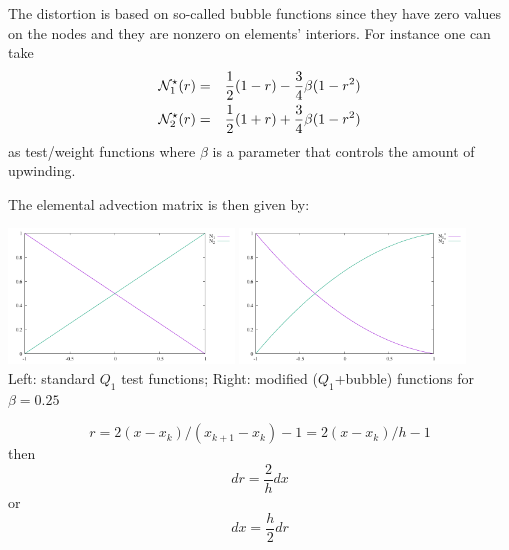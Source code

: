 The distortion is based on so-called bubble functions since they have zero
values on the nodes and they are nonzero on elements' interiors.
For instance one can take
\begin{eqnarray}
{{\mathcal{N}}}^\star_1(r)&=&\frac{1}{2}(1-r)-\frac{3}{4}\beta(1-r^2) \\
{{\mathcal{N}}}^\star_2(r)&=&\frac{1}{2}(1+r)+\frac{3}{4}\beta(1-r^2) 
\end{eqnarray}
as test/weight functions
where $\beta$ is a parameter that controls the amount of upwinding. 

The elemental advection matrix is then given by:
\begin{center}
\includegraphics[width=6cm]{images/supg/bubble1}
\includegraphics[width=6cm]{images/supg/bubble2}\\
{\captionfont Left: standard $Q_1$ test functions; Right: modified ($Q_1$+bubble) functions
for $\beta=0.25$}
\end{center}

\[
r = 2(x-x_k)/(x_{k+1}-x_{k}) -1 =2(x-x_k)/h  -1
\]
then 
\[
dr = \frac{2}{h} dx
\]
or
\[
dx=\frac{h}{2} dr
\]


